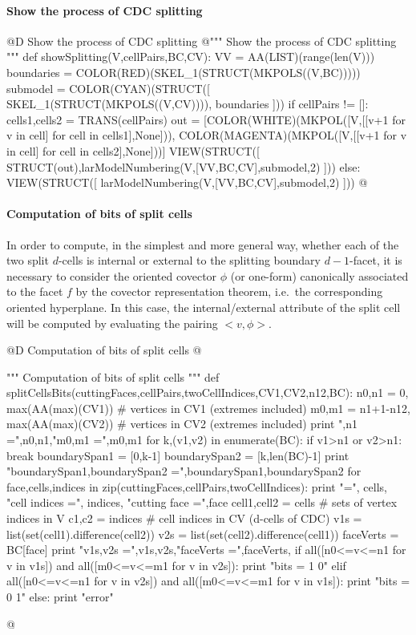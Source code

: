 \documentclass[11pt,oneside]{article}	%
\begin{document}
\paragraph{Show the process of CDC splitting}

@D Show the process of CDC splitting
@{""" Show the process of CDC splitting """
def showSplitting(V,cellPairs,BC,CV):
	VV = AA(LIST)(range(len(V)))
	boundaries = COLOR(RED)(SKEL_1(STRUCT(MKPOLS((V,BC)))))
	submodel = COLOR(CYAN)(STRUCT([ SKEL_1(STRUCT(MKPOLS((V,CV)))), boundaries ]))
	if cellPairs != []:
		cells1,cells2 = TRANS(cellPairs)
		out = [COLOR(WHITE)(MKPOL([V,[[v+1 for v in cell] for cell in cells1],None])), 
				COLOR(MAGENTA)(MKPOL([V,[[v+1 for v in cell] for cell in cells2],None]))]
		VIEW(STRUCT([ STRUCT(out),larModelNumbering(V,[VV,BC,CV],submodel,2) ]))
	else:
		VIEW(STRUCT([ larModelNumbering(V,[VV,BC,CV],submodel,2) ]))
@}



\paragraph{Computation of bits of split cells}

In order to compute, in the simplest and more general way, whether each of the two split $d$-cells is internal or external to the splitting boundary $d-1$-facet, it is necessary to consider the oriented covector $\phi$ (or one-form) canonically associated to the facet $f$ by the covector representation theorem, i.e.~the corresponding oriented hyperplane. In this case, the internal/external attribute of the split cell will be computed by evaluating the pairing $<v,\phi>$.

@D Computation of bits of split cells
@{""" Computation of bits of split cells """
def splitCellsBits(cuttingFaces,cellPairs,twoCellIndices,CV1,CV2,n12,BC):
	n0,n1 = 0, max(AA(max)(CV1))			# vertices in CV1 (extremes included)
	m0,m1 = n1+1-n12, max(AA(max)(CV2))		# vertices in CV2 (extremes included)
	print ",n1 =",n0,n1,"m0,m1 =",m0,m1
	for k,(v1,v2) in enumerate(BC):
		if v1>n1 or v2>n1: break
	boundarySpan1 = [0,k-1]
	boundarySpan2 = [k,len(BC)-1]
	print "boundarySpan1,boundarySpan2 =",boundarySpan1,boundarySpan2
	for face,cells,indices in zip(cuttingFaces,cellPairs,twoCellIndices):
		print "\ncells =", cells, "cell indices =", indices, "cutting face =",face
		cell1,cell2 = cells  # sets of vertex indices in V
		c1,c2 = indices  # cell indices in CV  (d-cells of CDC)
		v1s = list(set(cell1).difference(cell2))
		v2s = list(set(cell2).difference(cell1))
		faceVerts = BC[face]
		print "v1s,v2s =",v1s,v2s,"faceVerts =",faceVerts,
		if all([n0<=v<=n1 for v in v1s]) and all([m0<=v<=m1 for v in v2s]): print "bits = 1 0"
		elif all([n0<=v<=n1 for v in v2s]) and all([m0<=v<=m1 for v in v1s]): print "bits = 0 1"
		else: print "error"

@}
\end{document}
